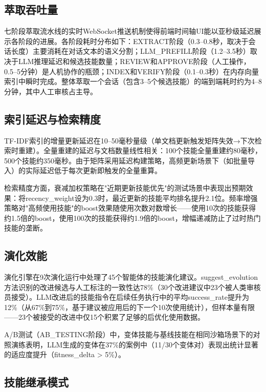 \documentclass[conference]{IEEEtran}
\begin{document}
\subsection{萃取吞吐量}

七阶段萃取流水线的实时WebSocket推送机制使得前端时间轴UI能以亚秒级延迟展示各阶段的进展。各阶段耗时分布如下：EXTRACT阶段（0.3--0.8秒，取决于会话长度）主要消耗在对话文本的语义分割；LLM\_PREFILL阶段（1.2--3.5秒）取决于LLM推理延迟和候选技能数量；REVIEW和APPROVE阶段（人工操作，0.5--5分钟）是人机协作的瓶颈；INDEX和VERIFY阶段（0.1--0.3秒）在内存向量索引中瞬时完成。整体萃取一个会话（包含3--5个候选技能）的端到端耗时约为4--8分钟，其中人工审核占主导。

\subsection{索引延迟与检索精度}

TF-IDF索引的增量更新延迟在10--50毫秒量级（单文档更新触发矩阵失效→下次检索时重建）。全量重建的延迟与文档数量线性相关：100个技能全量重建约80毫秒，500个技能约350毫秒。由于矩阵采用延迟构建策略，高频更新场景下（如批量导入）的实际延迟低于每次更新即触发的全量重算。

检索精度方面，衰减加权策略在"近期更新技能优先"的测试场景中表现出预期效果：将recency\_weight设为0.3时，最近更新的技能平均排名提升2.1位。频率增强策略对"高频使用技能"的boost效果随使用次数对数增长——使用10次的技能获得约1.5倍的boost，使用100次的技能获得约1.9倍的boost，增幅递减防止了过时热门技能的垄断。

\subsection{演化效能}

演化引擎在9次演化运行中处理了45个智能体的技能演化建议。suggest\_evolution方法识别的改进候选与人工标注的一致性达78\%（30个改进建议中23个被人类审核员接受）。LLM改进后的技能指令在后续任务执行中的平均success\_rate提升为12\%（从67\%到75\%，基于建议被应用后的下一个10次使用统计），但样本量有限——23个被接受的改进中仅15个积累了足够的后优化使用数据。

A/B测试（AB\_TESTING阶段）中，变体技能与基线技能在相同沙箱场景下的对照演练表明，LLM生成的变体在37\%的案例中（11/30个变体对）表现出统计显著的适应度提升（fitness\_delta > 5\%）。

\subsection{技能继承模式}
\end{document}
